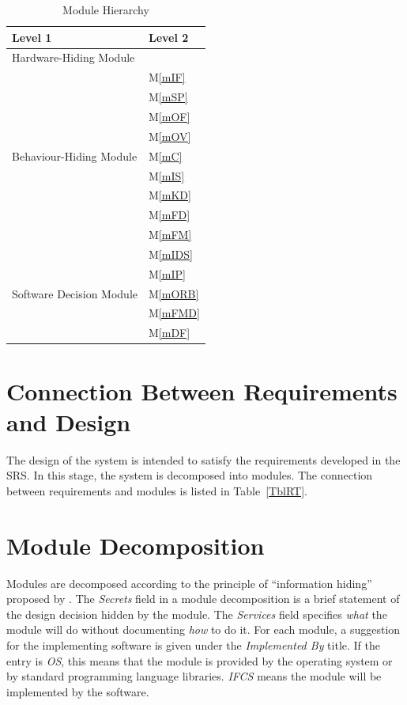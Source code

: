 \documentclass[12pt, titlepage]{article}
\newcommand{\mref}[1]{M\ref{#1}}
\begin{document}
\begin{table}[h!]
\centering
\begin{tabular}{p{} p{}}
\toprule
\textbf{Level 1} & \textbf{Level 2}\\
\midrule

{Hardware-Hiding Module} & ~ \\
\midrule

\multirow{9}{0.3\textwidth}{Behaviour-Hiding Module} & \mref{mIF}\\
& \mref{mSP}\\
& \mref{mOF}\\
& \mref{mOV}\\
& \mref{mC}\\
& \mref{mIS}\\
& \mref{mKD}\\ 
& \mref{mFD}\\
& \mref{mFM}\\
\midrule

\multirow{5}{0.3\textwidth}{Software Decision Module} & \mref{mIDS}\\
& \mref{mIP}\\
& \mref{mORB}\\
& \mref{mFMD}\\
& \mref{mDF}\\
\bottomrule

\end{tabular}
\caption{Module Hierarchy}
\label{TblMH}
\end{table}

\section{Connection Between Requirements and Design} \label{SecConnection}

The design of the system is intended to satisfy the requirements developed in
the SRS. In this stage, the system is decomposed into modules. The connection
between requirements and modules is listed in Table~\ref{TblRT}.

\section{Module Decomposition} \label{SecMD}

Modules are decomposed according to the principle of ``information hiding''
proposed by \citet{ParnasEtAl1984}. The \emph{Secrets} field in a module
decomposition is a brief statement of the design decision hidden by the
module. The \emph{Services} field specifies \emph{what} the module will do
without documenting \emph{how} to do it. For each module, a suggestion for the
implementing software is given under the \emph{Implemented By} title. If the
entry is \emph{OS}, this means that the module is provided by the operating
system or by standard programming language libraries.  \emph{IFCS} means the
module will be implemented by the \progname{} software.
\end{document}
